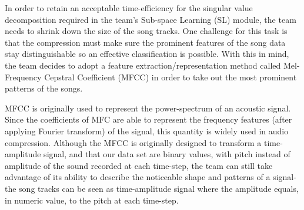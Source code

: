 \begin{par}
    \par \hspace{15pt} In order to retain an acceptable time-efficiency for the singular value decomposition required in the team's Sub-space Learning (SL) module, the team needs to shrink down the size of the song tracks. One challenge for this task is that the compression must make sure the prominent features of the song data stay distinguishable so an effective classification is possible. With this in mind, the team decides to adopt a feature extraction/representation method called Mel-Frequency Cepstral Coefficient (MFCC) in order to take out the most prominent patterns of the songs.
    \par \hspace{15pt} MFCC is originally used to represent the power-spectrum of an acoustic signal. Since the coefficients of MFC are able to represent the frequency features (after applying Fourier transform) of the signal, this quantity is widely used in audio compression. Although the MFCC is originally designed to transform a time-amplitude signal, and that our data set are binary values, with pitch instead of amplitude of the sound recorded at each time-step, the team can still take advantage of its ability to describe the noticeable shape and patterns of a signal-the song tracks can be seen as time-amplitude signal where the amplitude equals, in numeric value, to the pitch at each time-step.

\end{par}